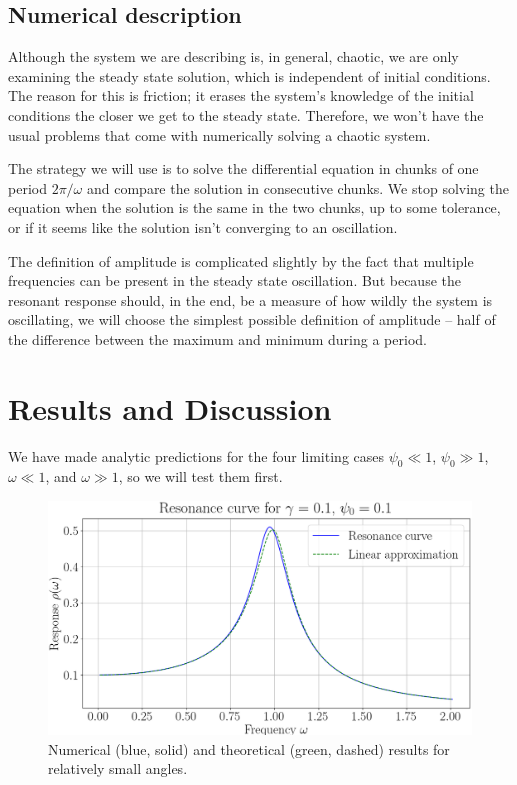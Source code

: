 \documentclass[10pt,a4paper,twocolumn]{article}
\begin{document}
\subsection{Numerical description}

Although the system we are describing is, in general, chaotic, we are only examining the steady state solution, which is independent of initial conditions. The reason for this is friction; it erases the system's knowledge of the initial conditions the closer we get to the steady state. Therefore, we won't have the usual problems that come with numerically solving a chaotic system.

The strategy we will use is to solve the differential equation in chunks of one period $2 \pi / \omega$ and compare the solution in consecutive chunks. We stop solving the equation when the solution is the same in the two chunks, up to some tolerance, or if it seems like the solution isn't converging to an oscillation.

The definition of amplitude is complicated slightly by the fact that multiple frequencies can be present in the steady state oscillation. But because the resonant response should, in the end, be a measure of how wildly the system is oscillating, we will choose the simplest possible definition of amplitude -- half of the difference between the maximum and minimum during a period.


\section{Results and Discussion}

We have made analytic predictions for the four limiting cases $\psi_0 \ll 1$, $\psi_0 \gg 1$, $\omega \ll 1$, and $\omega \gg 1$, so we will test them first.

\begin{figure}
\centering
\captionsetup{justification=centering}
\includegraphics[scale=0.25]{small_amp.png}
\caption{Numerical (blue, solid) and theoretical (green, dashed) results for relatively small angles.}
\label{fig:small_amp}
\end{figure}
\end{document}
